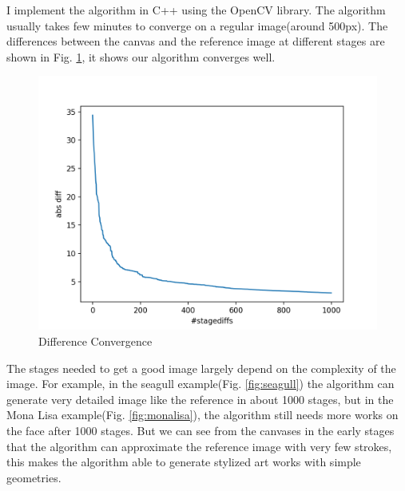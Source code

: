 \documentclass[a4paper,conference]{IEEEtran}
\begin{document}
I implement the algorithm in C++ using the OpenCV library\cite{opencv_library}. The algorithm usually takes few minutes to converge on a regular image(around 500px). The differences between the canvas and the reference image at different stages are shown in Fig. \ref{fig:loss}, it shows our algorithm converges well.
\begin{figure}[htp]
  \centering
  \includegraphics[width=\columnwidth]{imgs/seagull-loss.png}
  \caption{Difference Convergence}
  \label{fig:loss}
\end{figure}
The stages needed to get a good image largely depend on the complexity of the image. For example, in the seagull example(Fig. \ref{fig:seagull}) the algorithm can generate very detailed image like the reference in about 1000 stages, but in the Mona Lisa example(Fig. \ref{fig:monalisa}), the algorithm still needs more works on the face after 1000 stages. But we can see from the canvases in the early stages that the algorithm can approximate the reference image with very few strokes, this makes the algorithm able to generate stylized art works with simple geometries. 
\end{document}

